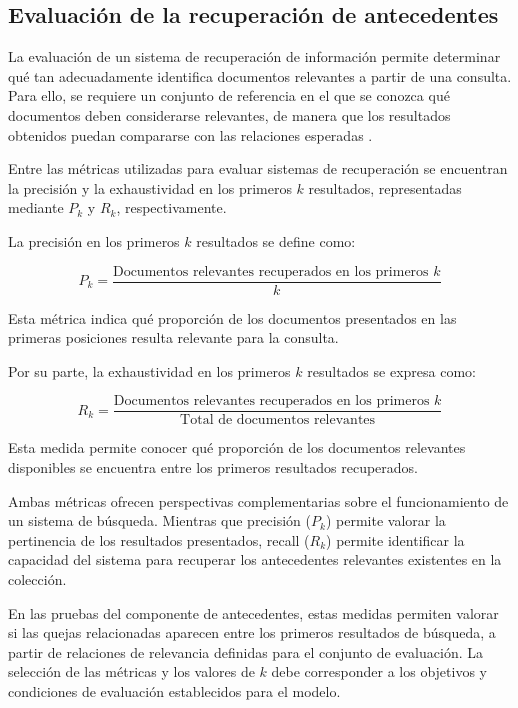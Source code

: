 \subsection{Evaluación de la recuperación de antecedentes}

La evaluación de un sistema de recuperación de información permite determinar qué tan adecuadamente identifica documentos relevantes a partir de una consulta. Para ello, se requiere un conjunto de referencia en el que se conozca qué documentos deben considerarse relevantes, de manera que los resultados obtenidos puedan compararse con las relaciones esperadas \cite{manning2008ir}.

Entre las métricas utilizadas para evaluar sistemas de recuperación se encuentran la precisión y la exhaustividad en los primeros $k$ resultados, representadas mediante
$P_k$ y $R_k$, respectivamente.

La precisión en los primeros $k$ resultados se define como:

\begin{equation}
    P_k =
    \frac{\text{Documentos relevantes recuperados en los primeros } k}
    {k}
    \label{eq:precision_k}
\end{equation}

Esta métrica indica qué proporción de los documentos presentados en las primeras posiciones resulta relevante para la consulta.

Por su parte, la exhaustividad en los primeros $k$ resultados se expresa como:

\begin{equation}
    R_k =
    \frac{\text{Documentos relevantes recuperados en los primeros } k}
    {\text{Total de documentos relevantes}}
    \label{eq:recall_k}
\end{equation}

Esta medida permite conocer qué proporción de los documentos relevantes disponibles se encuentra entre los primeros resultados recuperados.

Ambas métricas ofrecen perspectivas complementarias sobre el funcionamiento de un sistema de búsqueda. Mientras que precisión ($P_k$) permite valorar la pertinencia de los resultados presentados, recall ($R_k$) permite identificar la capacidad del sistema para recuperar los antecedentes relevantes existentes en la colección.

En las pruebas del componente de antecedentes, estas medidas permiten valorar si las quejas relacionadas aparecen entre los primeros resultados de búsqueda, a partir de relaciones de relevancia definidas para el conjunto de evaluación. La selección de las métricas y los valores de $k$ debe corresponder a los objetivos y condiciones de evaluación establecidos para el modelo.

